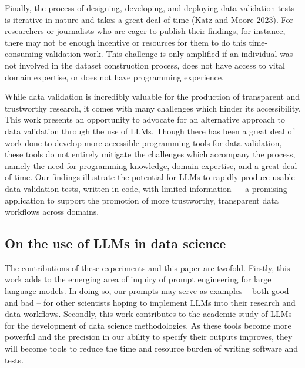 \documentclass[
  letterpaper,
  DIV=11,
  numbers=noendperiod]{scrartcl}
\begin{document}
Finally, the process of designing, developing, and deploying data
validation tests is iterative in nature and takes a great deal of time
(Katz and Moore 2023). For researchers or journalists who are eager to
publish their findings, for instance, there may not be enough incentive
or resources for them to do this time-consuming validation work. This
challenge is only amplified if an individual was not involved in the
dataset construction process, does not have access to vital domain
expertise, or does not have programming experience.

While data validation is incredibly valuable for the production of
transparent and trustworthy research, it comes with many challenges
which hinder its accessibility. This work presents an opportunity to
advocate for an alternative approach to data validation through the use
of LLMs. Though there has been a great deal of work done to develop more
accessible programming tools for data validation, these tools do not
entirely mitigate the challenges which accompany the process, namely the
need for programming knowledge, domain expertise, and a great deal of
time. Our findings illustrate the potential for LLMs to rapidly produce
usable data validation tests, written in code, with limited information
--- a promising application to support the promotion of more
trustworthy, transparent data workflows across domains.

\hypertarget{on-the-use-of-llms-in-data-science}{%
\subsection{On the use of LLMs in data
science}\label{on-the-use-of-llms-in-data-science}}

The contributions of these experiments and this paper are twofold.
Firstly, this work adds to the emerging area of inquiry of prompt
engineering for large language models. In doing so, our prompts may
serve as examples -- both good and bad -- for other scientists hoping to
implement LLMs into their research and data workflows. Secondly, this
work contributes to the academic study of LLMs for the development of
data science methodologies. As these tools become more powerful and the
precision in our ability to specify their outputs improves, they will
become tools to reduce the time and resource burden of writing software
and tests.
\end{document}
